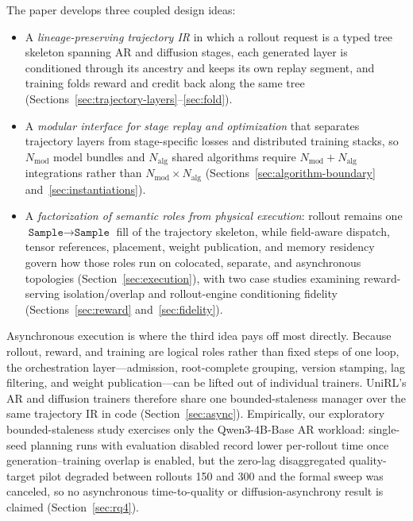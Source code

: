 \documentclass[10pt]{article}
\newcommand{\system}{UniRL\xspace}
\newcommand{\sample}{\texttt{Sample}}
\begin{document}
The paper develops three coupled design ideas:

\begin{itemize}
  \item A \emph{lineage-preserving trajectory IR} in which a rollout request is a typed tree skeleton spanning AR and diffusion stages, each generated layer is conditioned through its ancestry and keeps its own replay segment, and training folds reward and credit back along the same tree (Sections~\ref{sec:trajectory-layers}--\ref{sec:fold}).
  \item A \emph{modular interface for stage replay and optimization} that separates trajectory layers from stage-specific losses and distributed training stacks, so $N_{\mathrm{mod}}$ model bundles and $N_{\mathrm{alg}}$ shared algorithms require $N_{\mathrm{mod}}+N_{\mathrm{alg}}$ integrations rather than $N_{\mathrm{mod}}\times N_{\mathrm{alg}}$ (Sections~\ref{sec:algorithm-boundary} and~\ref{sec:instantiations}).
  \item A \emph{factorization of semantic roles from physical execution}: rollout remains one $\sample\!\rightarrow\!\sample$ fill of the trajectory skeleton, while field-aware dispatch, tensor references, placement, weight publication, and memory residency govern how those roles run on colocated, separate, and asynchronous topologies (Section~\ref{sec:execution}), with two case studies examining reward-serving isolation/overlap and rollout-engine conditioning fidelity (Sections~\ref{sec:reward} and~\ref{sec:fidelity}).
\end{itemize}

Asynchronous execution is where the third idea pays off most directly.
Because rollout, reward, and training are logical roles rather than fixed steps of one loop, the orchestration layer---admission, root-complete grouping, version stamping, lag filtering, and weight publication---can be lifted out of individual trainers.
\system's AR and diffusion trainers therefore share one bounded-staleness manager over the same trajectory IR in code (Section~\ref{sec:async}).
Empirically, our exploratory bounded-staleness study exercises only the Qwen3-4B-Base AR workload: single-seed planning runs with evaluation disabled record lower per-rollout time once generation--training overlap is enabled, but the zero-lag disaggregated quality-target pilot degraded between rollouts 150 and 300 and the formal sweep was canceled, so no asynchronous time-to-quality or diffusion-asynchrony result is claimed (Section~\ref{sec:rq4}).
\end{document}
